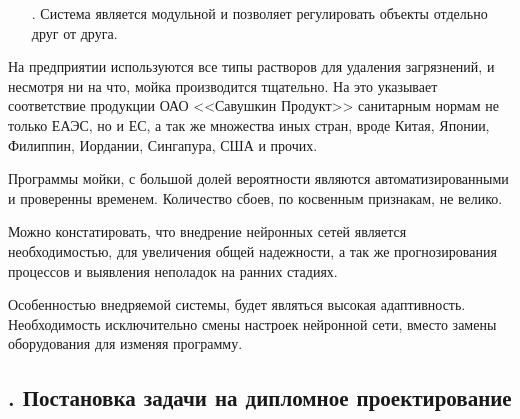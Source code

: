 {\begin{itemize}[leftmargin=2.15cm, labelwidth=0.65cm, labelsep=0.0cm]
  	\item[\theitemcntr. ] Система является модульной и позволяет регулировать объекты отдельно друг от друга.
  	\addtocounter{itemcntr}{1}
  	
  	\setcounter{itemcntr}{1}
  \end{itemize}
  
  \par \redline На предприятии используются все типы растворов для удаления загрязнений, и несмотря ни на что, мойка производится тщательно. На это указывает соответствие продукции ОАО <<Савушкин Продукт>> санитарным нормам не только ЕАЭС, но и ЕС, а так же множества иных стран, вроде Китая, Японии, Филиппин, Иордании, Сингапура, США и прочих.
  
  \par \redline Программы мойки, с большой долей вероятности являются автоматизированными и проверенны временем. Количество сбоев, по косвенным признакам, не велико.
  
  \par \redline Можно констатировать, что внедрение нейронных сетей является необходимостью, для увеличения общей надежности, а так же прогнозирования процессов и выявления неполадок на ранних стадиях.  
  
  \par \redline Особенностью внедряемой системы, будет являться высокая адаптивность. Необходимость исключительно смены настроек нейронной сети, вместо замены оборудования для изменяя программу.
  
  \par 
}


\subtitlespace

\subsection*{ 
	\gostTitleFont
	\redline
	\thechaptercntr .\thesubchaptercntr \spc
	Постановка задачи на дипломное проектирование 
} \addtocounter{subchaptercntr}{1}

\subtitlespace

